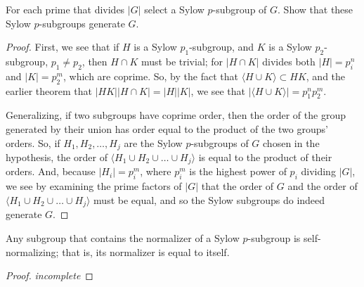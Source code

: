 \documentclass[12pt]{article}
\theoremstyle{definition}
\newenvironment{problem}[2][Problem]{\begin{trivlist}
\item[\hskip \labelsep {\bfseries #1}\hskip \labelsep {\bfseries #2.}]}{\end{trivlist}}
\begin{document}
\begin{problem}{19}
For each prime that divides $\lvert G \rvert$ select a Sylow $p$-subgroup of $G$. Show that these Sylow $p$-subgroups generate $G$.
\begin{proof}
	First, we see that if $H$ is a Sylow $p_1$-subgroup, and $K$ is a Sylow $p_2$-subgroup, $p_1 \neq p_2$, then $H\cap K$ must be trivial; for $\left \lvert { H \cap K } \right \lvert $ divides both $\left \lvert { H } \right \lvert  = p_i^n$ and $\left \lvert { K } \right \lvert = p_2^m$, which are coprime. So, by the fact that $\langle H \cup K\rangle \subset HK$, and the earlier theorem that $\left \lvert { HK } \right \lvert \left \lvert { H \cap K } \right \lvert  = \left \lvert { H } \right \lvert  \left \lvert { K } \right \lvert $, we see that $\left \lvert { \langle H \cup K\rangle } \right \lvert  = p_1^n p_2^m$.
	\par Generalizing, if two subgroups have coprime order, then the order of the group generated by their union has order equal to the product of the two groups' orders. So, if $H_1, H_2, \dots , H_j$ are the Sylow $p$-subgroups of $G$ chosen in the hypothesis, the order of $\langle H_1 \cup H_2 \cup \dots \cup H_j\rangle$ is equal to the product of their orders. And, because $\left \lvert { H_i } \right \lvert  = p_i^m$, where $p_i^m$ is the highest power of $p_i$ dividing $\left \lvert { G } \right \lvert $, we see by examining the prime factors of $\left \lvert { G } \right \lvert $ that the order of $G$ and the order of $\langle H_1 \cup H_2 \cup \dots \cup H_j\rangle$ must be equal, and so the Sylow subgroups do indeed generate $G$.
\end{proof}
\end{problem}
\begin{problem}{20}
Any subgroup that contains the normalizer of a Sylow $p$-subgroup is self-normalizing; that is, its normalizer is equal to itself.
\begin{proof}
	\textit{incomplete}
\end{proof}
\end{problem}
\end{document}
